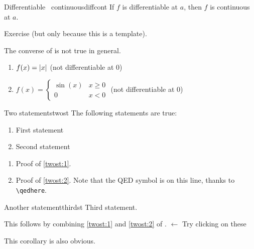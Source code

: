 \documentclass[10pt]{extarticle}
\makeatletter
\newcommand{\<}{\langle}
\renewcommand{\>}{\rangle}
\renewcommand{\implies}{\@ifstar{\ensuremath{\Longrightarrow}}{\ensuremath{\Rightarrow}}} %
\renewenvironment{proof}[1][\proofname] {\par\pushQED{\qed}{\normalfont\sffamily\bfseries\topsep6\p@\@plus6\p@\relax #1\@addpunct{.} }}{\popQED\endtrivlist\@endpefalse}
\theoremstyle{mystyle}{\newtheorem*{remark}{Remark}}
\theoremstyle{mystyle}{\newtheorem*{remarks}{Remarks}}
\theoremstyle{mystyle}{\newtheorem*{example}{Example}}
\theoremstyle{mystyle}{\newtheorem*{examples}{Examples}}
\theoremstyle{definition}{\newtheorem*{exercise}{Exercise}}
\theoremstyle{warn}
\makeatother
\begin{document}
\begin{proposition}{Differentiable \implies\ continuous}{diffcont}
If $f$ is differentiable at $a$, then $f$ is continuous at $a$.
\end{proposition}
\begin{proof}
Exercise (but only because this is a template).
\end{proof}

The converse of  is not true in general.

\begin{examples}\leavevmode %
\begin{enumerate}
    \item $f(x)=\abs{x}$ \hfill (not differentiable at $0$)
    \item $f(x)=\begin{cases} \sin(x) & x\ge 0 \\ 0 & x<0 \end{cases}$ \hfill (not differentiable at $0$)
\end{enumerate}
\end{examples}

\begin{theorem}{Two statements}{twost}
The following statements are true:
\begin{enumerate}[ref={(\arabic*)}]
    \item\label{twost:1} First statement
    \item\label{twost:2} Second statement
\end{enumerate}
\end{theorem}
\begin{proof}%
\begin{enumerate}
    \item Proof of \ref{twost:1}.
    \item Proof of \ref{twost:2}. Note that the QED symbol is on this line, thanks to \verb!\qedhere!. \qedhere %
\end{enumerate}
\end{proof}

\begin{corollary}{Another statement}{thirdst}
Third statement.
\end{corollary}
\begin{proof}
This follows by combining \ref{twost:1} and \ref{twost:2} of . $\gets$ \scriptsize{\textsf{Try clicking on these}}
\end{proof}
\begin{remark}
This corollary is also obvious.
\end{remark}
\end{document}
